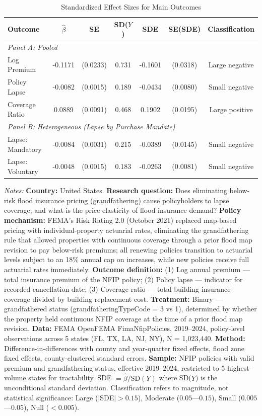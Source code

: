 \begin{table}[H]
\centering
\caption{Standardized Effect Sizes for Main Outcomes}
\label{tab:sde}
\begin{threeparttable}
\begin{tabular}{lcccccc}
\toprule
Outcome & $\hat{\beta}$ & SE & SD($Y$) & SDE & SE(SDE) & Classification \\
\midrule
\multicolumn{7}{l}{\textit{Panel A: Pooled}} \\
Log Premium & -0.1171 & (0.0233) & 0.731 & -0.1601 & (0.0318) & Large negative \\
Policy Lapse & -0.0082 & (0.0015) & 0.189 & -0.0434 & (0.0080) & Small negative \\
Coverage Ratio & 0.0889 & (0.0091) & 0.468 & 0.1902 & (0.0195) & Large positive \\
\midrule
\multicolumn{7}{l}{\textit{Panel B: Heterogeneous (Lapse by Purchase Mandate)}} \\
Lapse: Mandatory & -0.0084 & (0.0031) & 0.215 & -0.0389 & (0.0145) & Small negative \\
Lapse: Voluntary & -0.0048 & (0.0015) & 0.183 & -0.0263 & (0.0081) & Small negative \\
\bottomrule
\end{tabular}
\begin{tablenotes}[flushleft]
\small
\item \textit{Notes:} \textbf{Country:} United States. \textbf{Research question:} Does eliminating below-risk flood insurance pricing (grandfathering) cause policyholders to lapse coverage, and what is the price elasticity of flood insurance demand? \textbf{Policy mechanism:} FEMA's Risk Rating 2.0 (October 2021) replaced map-based pricing with individual-property actuarial rates, eliminating the grandfathering rule that allowed properties with continuous coverage through a prior flood map revision to pay below-risk premiums; all renewing policies transition to actuarial levels subject to an 18\% annual cap on increases, while new policies receive full actuarial rates immediately. \textbf{Outcome definition:} (1) Log annual premium --- total insurance premium of the NFIP policy; (2) Policy lapse --- indicator for recorded cancellation date; (3) Coverage ratio --- total building insurance coverage divided by building replacement cost. \textbf{Treatment:} Binary --- grandfathered status (grandfatheringTypeCode = 3 vs 1), determined by whether the property held continuous NFIP coverage at the time of a prior flood map revision. \textbf{Data:} FEMA OpenFEMA FimaNfipPolicies, 2019--2024, policy-level observations across 5 states (FL, TX, LA, NJ, NY), N = 1,023,440. \textbf{Method:} Difference-in-differences with county and year-quarter fixed effects, flood zone fixed effects, county-clustered standard errors. \textbf{Sample:} NFIP policies with valid premium and grandfathering status, effective 2019--2024, restricted to 5 highest-volume states for tractability. SDE $= \hat{\beta} / \text{SD}(Y)$ where SD($Y$) is the unconditional standard deviation. Classification refers to magnitude, not statistical significance: Large ($|$SDE$| > 0.15$), Moderate ($0.05$---$0.15$), Small ($0.005$---$0.05$), Null ($< 0.005$).

\end{tablenotes}
\end{threeparttable}
\end{table}
